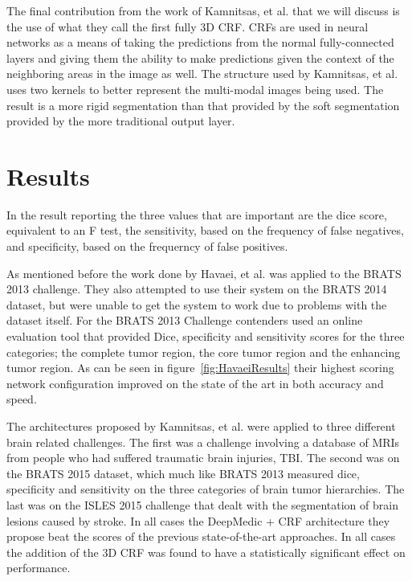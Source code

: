 \documentclass{sig-alternate}
\begin{document}
The final contribution from the work of Kamnitsas, et al. that we will discuss is the use of what they call the first fully 3D CRF. CRFs are used in neural networks as a means of taking the predictions from the normal fully-connected layers and giving them the ability to make predictions given the context of the neighboring areas in the image as well. The structure used by Kamnitsas, et al. uses two kernels to better represent the multi-modal images being used. The result is a more rigid segmentation than that provided by the soft segmentation provided by the more traditional output layer.


\section{Results}
\label{sec:results}
In the result reporting the three values that are important are the dice score, equivalent to an F test, the sensitivity, based on the frequency of false negatives, and specificity, based on the frequerncy of false positives.

As mentioned before the work done by Havaei, et al. was applied to the BRATS 2013 challenge. They also attempted to use their system on the BRATS 2014 dataset, but were unable to get the system to work due to problems with the dataset itself. For the BRATS 2013 Challenge contenders used an online evaluation tool that provided Dice, specificity and sensitivity scores for the three categories; the complete tumor region, the core tumor region and the enhancing tumor region. As can be seen in figure~\ref{fig:HavaeiResults} their highest scoring network configuration improved on the state of the art in both accuracy and speed.

\begin{figure*}
\centering
{}
\caption{Havaei, et al. best performnce versus previous state-of-the-arts.~\cite{Havaei:2017}}
\label{fig:HavaeiResults}
\end{figure*}

The architectures proposed by Kamnitsas, et al. were applied to three different brain related challenges. The first was a challenge involving a database of MRIs from people who had suffered traumatic brain injuries, TBI. The second was on the BRATS 2015 dataset, which much like BRATS 2013 measured dice, specificity and sensitivity on the three categories of brain tumor hierarchies. The last was on the ISLES 2015 challenge that dealt with the segmentation of brain lesions caused by stroke. In all cases the DeepMedic + CRF architecture they propose beat the scores of the previous state-of-the-art approaches. In all cases the addition of the 3D CRF was found to have a statistically significant effect on performance.
\end{document}
